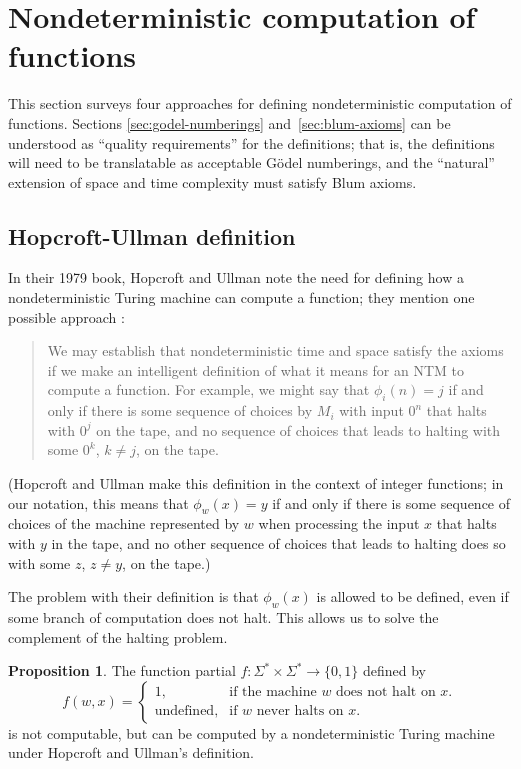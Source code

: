 \documentclass[12pt]{article}
\theoremstyle{definition}
\newtheorem{proposition}[definition]{Proposition}
\begin{document}
\section{Nondeterministic computation of functions}
\label{sec:nondeterministic_computation_of_functions}

This section surveys four approaches
for defining nondeterministic computation of functions.
Sections \ref{sec:godel-numberings} and~\ref{sec:blum-axioms}
can be understood as ``quality requirements''
for the definitions;
that is, the definitions will need to be translatable as
acceptable Gödel numberings,
and the ``natural'' extension of space and time complexity
must satisfy Blum axioms.

\subsection{Hopcroft-Ullman definition}

In their 1979 book,
Hopcroft and Ullman note the need
for defining how a nondeterministic Turing machine can compute a function;
they mention one possible approach \cite[p.~313]{HopcroftUllman1979}:
\begin{quotation}
    We may establish that nondeterministic time and space
    satisfy the axioms if we make an intelligent definition of what it means
    for an NTM to compute a function.
    For example, we might say that $\phi_i(n) = j$
    if and only if there is some sequence of choices by $M_i$ with input $0^n$
    that halts with $0^j$ on the tape,
    and no sequence of choices that leads to halting with some $0^k$, $k \neq j$,
    on the tape.
\end{quotation}
(Hopcroft and Ullman make this definition in the context of integer functions;
in our notation, this means that $\phi_w(x) = y$
if and only if there is some sequence of choices of the machine represented by $w$
when processing the input $x$ that halts with $y$ in the tape,
and no other sequence of choices that leads to halting does so with some $z$,
$z \neq y$, on the tape.)

The problem with their definition is that $\phi_w(x)$ is allowed to be defined,
even if some branch of computation does not halt.
This allows us to solve the complement of the halting problem.

\begin{proposition}
    The function partial $f: \Sigma^* \times \Sigma^* \to \{0, 1\}$ defined by
    \begin{equation*}
        f(w, x) = \begin{cases}
            1, & \text{if the machine $w$ does not halt on $x$.} \\
            \text{undefined}, &\text{if $w$ never halts on $x$.}
        \end{cases}
    \end{equation*}
    is not computable,
    but can be computed by a nondeterministic Turing machine under
    Hopcroft and Ullman's definition.
\end{proposition}
\end{document}
